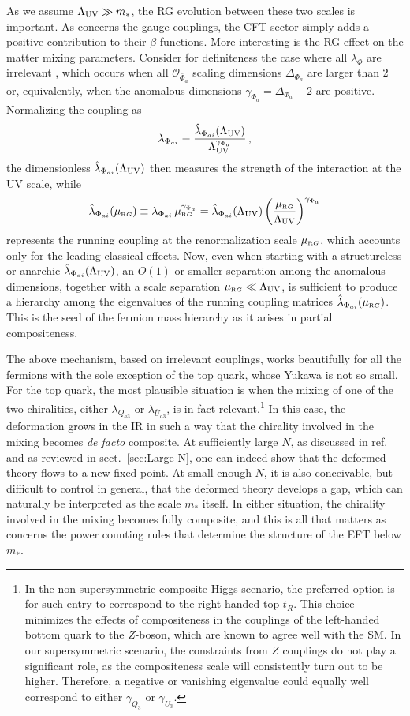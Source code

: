 \documentclass[a4paper,12pt]{article}
\newcommand{\beq}{\begin{equation}}
\newcommand{\eeq}{\end{equation}}
\def\sec#1{sect.~\ref{#1}}
\def\O{\mathcal{O}}
\def\LUV{\Lambda_{\rm UV}}
\def\mst{m_*}
\def\hlambda{\hat\lambda}
\def\muRG{\mu_{\scriptscriptstyle{\textrm RG}}}
\begin{document}
As we assume $\LUV\gg \mst$, the RG evolution between these two scales is important. As concerns the gauge couplings, the CFT sector simply adds a positive contribution to their $\beta$-functions.  More interesting is the RG effect on the matter mixing  parameters. Consider for definiteness the case where all $\lambda_\Phi$ are irrelevant , which occurs when all $\O_{{\bar \Phi}_a}$ scaling dimensions $\Delta_{\Phi_a}$ are larger than 2 or, equivalently, when the anomalous dimensions $\gamma_{\Phi_a}=\Delta_{\Phi_a}-2$ are positive.
Normalizing the coupling as 
\beq
\lambda_{\Phi_{ai}}\equiv \frac{\hlambda_{\Phi_{ai}}(\LUV)}{\LUV^{\gamma_{\Phi_a}}} \, ,
\eeq
the dimensionless $\hlambda_{\Phi_{ai}}(\LUV)$ then measures the strength of the interaction at the UV scale, while 
\beq
\hlambda_{\Phi_{ai}}(\muRG) \equiv  \lambda_{\Phi_{ai}} \,\muRG^{\gamma_{\Phi_a}}= \hlambda_{\Phi_{ai}}(\LUV) \left (\frac{\muRG}{\LUV}\right )^{\gamma_{\Phi_a}}
\label{running_lambda}
\eeq
represents the running coupling at the renormalization scale $\muRG$, which accounts only for the leading classical effects. Now, even when starting with a structureless or anarchic $\hlambda_{\Phi_{ai}}(\LUV)$, an $O(1)$ or smaller separation among the anomalous dimensions, together with a scale separation $\muRG \ll \LUV$, is sufficient to produce a hierarchy among the eigenvalues of the running coupling matrices $\hlambda_{\Phi_{ai}}(\muRG)$. This is the seed of the fermion mass hierarchy as it arises in partial compositeness.

The above mechanism, based on irrelevant couplings, works beautifully for all the fermions with the sole exception of the top quark,
whose Yukawa is not so small. For the top quark, the most plausible situation is when the mixing of one of the two chiralities,  either $\lambda_{Q_{a3}}$ or $\lambda_{{\bar U}_{a3}}$, is in fact  relevant.\footnote{In the non-supersymmetric composite Higgs scenario, the preferred option  is for such entry to correspond to the right-handed top $t_R$. This choice minimizes the effects of compositeness in the couplings of the left-handed bottom quark to the $Z$-boson, which are known to agree well with the SM. In our supersymmetric scenario, the constraints from $Z$ couplings do not play a significant role, as the compositeness scale will consistently turn out to be higher. Therefore, a negative or vanishing eigenvalue could equally well correspond to either $\gamma_{Q_3}$ or $\gamma_{{\bar U}_3}$.}
In this case, the deformation grows in the IR in such a way that the chirality involved in the mixing becomes {\it de facto} composite. At sufficiently large $N$,  as discussed in ref.~\cite{Contino:2004vy}
 and as reviewed in \sec{sec:Large N}, one can indeed show that the deformed theory flows to a new fixed point. At small enough $N$, it is also conceivable, but difficult  to control in general, that the deformed theory develops a gap, which can naturally be interpreted as the scale $\mst$ itself. In either situation, the chirality involved in the mixing becomes fully composite, and this is all that matters as concerns the power counting rules that determine the structure of the EFT below $\mst$.
\end{document}
